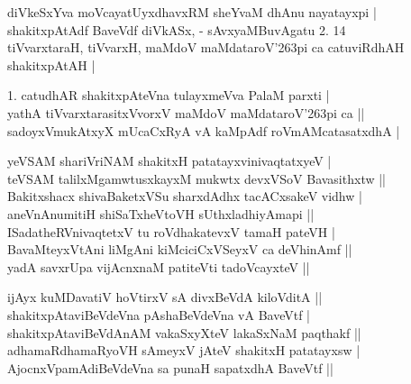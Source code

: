 \begin{entry}
\gl{}
\info{}{}{}{}
\begin{shl}
diVkeSxYva moVcayatUyxdhavxRM sheYvaM dhAnu nayatayxpi |\\
shakitxpAtAdf BaveVdf diVkASx, - sAvxyaMBuvAgatu 2. 14\\
tiVvarxtaraH, tiVvarxH, maMdoV maMdataroV\char'263pi ca catuviRdhAH shakitxpAtAH |
\end{shl}
\begin{shl}
1. catudhAR shakitxpAteVna tulayxmeVva PalaM parxti |\\
yathA tiVvarxtarasitxVvorxV maMdoV maMdataroV\char'263pi ca ||\\
sadoyxVmukAtxyX mUcaCxRyA vA kaMpAdf roVmAMcatasatxdhA |
\end{shl}
\end{entry}

\begin{entry}
\gl{}
\info{}{}{}{}
\begin{shl}
yeVSAM shariVriNAM shakitxH patatayxvinivaqtatxyeV |\\
teVSAM talilxMgamwtusxkayxM mukwtx devxVSoV Bavasithxtw ||\\
Bakitxshacx shivaBaketxVSu sharxdAdhx tacACxsakeV vidhw |\\
aneVnAnumitiH shiSaTxheVtoVH sUthxladhiyAmapi ||\\
ISadatheRVnivaqtetxV tu roVdhakatevxV tamaH pateVH |\\
BavaMteyxVtAni liMgAni kiMciciCxVSeyxV ca deVhinAmf ||\\
yadA savxrUpa vijAcnxnaM patiteVti tadoVcayxteV ||
\end{shl}
\end{entry}

\begin{entry}
\begin{shl}
ijAyx kuMDavatiV hoVtirxV sA divxBeVdA kiloVditA ||\\
shakitxpAtaviBeVdeVna pAshaBeVdeVna vA BaveVtf |\\
shakitxpAtaviBeVdAnAM vakaSxyXteV lakaSxNaM paqthakf ||\\
adhamaRdhamaRyoVH sAmeyxV jAteV shakitxH patatayxsw |\\
AjocnxVpamAdiBeVdeVna sa punaH sapatxdhA BaveVtf ||
\end{shl}
\end{entry}

